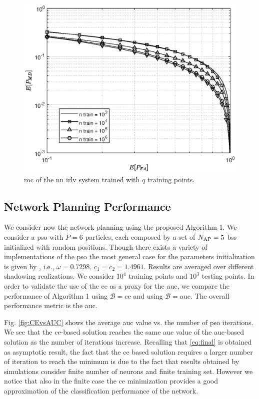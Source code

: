 \documentclass[conference,draftcls,onecolumn]{IEEEtran}
\begin{document}
\begin{figure}[t]
    \centering
    \includegraphics[width=0.9\columnwidth]{mean_maps_2.eps}
    \caption{\ac{roc} of the \ac{nn} \ac{irlv} system trained with $q$ training points.}
    \label{fig:n_train}
\end{figure}

\subsection{Network Planning Performance}

We consider now the network planning using the proposed Algorithm 1. We consider a \ac{pso} with $P=6$ particles, each composed by a set of $N_{\rm AP}=5$ \acp{bs} initialized with random positions. Though there exists a variety of implementations of the \ac{pso} the most general case for the parameters initialization is given by \cite{clerc2002}, i.e.,   $\omega=0.7298$, $c_1=c_2=1.4961$. Results are averaged over different shadowing realizations. We consider $10^4$ training  points and  $10^3$ testing points. In order to validate the use of the \ac{ce} as a proxy for the \ac{auc}, we compare the performance of Algorithm 1 using $\mathcal{B}=$\ac{ce} and using $\mathcal{B}=$\ac{auc}. The overall performance metric is the \ac{auc}.

Fig. \ref{fig:CEvsAUC} shows the average \ac{auc} value vs. the number of \ac{pso} iterations. We see that the \ac{ce}-based solution reaches the same  \ac{auc} value of the \ac{auc}-based solution as the number of iterations increase. Recalling that \ref{eq:final} is obtained as asymptotic result, the fact that the \ac{ce} based solution requires a larger number of iteration to reach the minimum is due to the fact that results obtained by simulations consider finite number of neurons and finite training set. However we notice that also in the finite case the \ac{ce} minimization provides a good approximation of the classification performance of the network.
\end{document}
